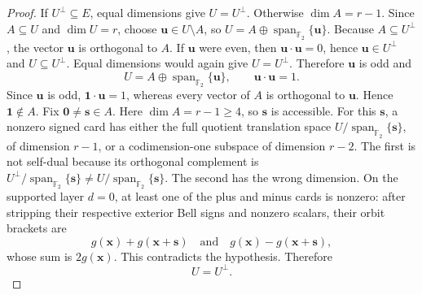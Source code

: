 \documentclass[11pt,letterpaper,onecolumn]{article}
\theoremstyle{plain}
\theoremstyle{definition}
\theoremstyle{remark}
\newcommand{\Ftwo}{\mathbb F_2}
\newcommand{\Span}{\operatorname{span}}
\newcommand{\one}{\mathbf 1}
\newcommand{\zero}{\mathbf 0}
\begin{document}
\begin{proof}
If \(U^\perp\subseteq E\), equal dimensions give \(U=U^\perp\).  Otherwise
\(\dim A=r-1\).  Since \(A\subseteq U\) and \(\dim U=r\), choose
\({\mathbf{u}}\in U\setminus A\), so
\(U=A\oplus\Span_{\Ftwo}\{{\mathbf{u}}\}\).  Because
\(A\subseteq U^\perp\), the vector \({\mathbf{u}}\) is orthogonal to \(A\).  If \({\mathbf{u}}\)
were even, then \({\mathbf{u}}\cdot {\mathbf{u}}=0\), hence \({\mathbf{u}}\in U^\perp\) and
\(U\subseteq U^\perp\). Equal dimensions would again give
\(U=U^\perp\).  Therefore \({\mathbf{u}}\) is odd and
\hypertarget{eq:v4-near-self-dual}{}
\begin{equation*}
 U=A\oplus\Span_{\Ftwo}\{{\mathbf{u}}\},
 \qquad {\mathbf{u}}\cdot {\mathbf{u}}=1.
\end{equation*}
Since \({\mathbf{u}}\) is odd, \(\one\cdot {\mathbf{u}}=1\), whereas every vector of \(A\) is
orthogonal to \({\mathbf{u}}\). Hence \(\one\notin A\).  Fix \(\zero\ne {\mathbf{s}}\in A\).
Here \(\dim A=r-1\ge4\), so \({\mathbf{s}}\) is accessible.  For this \({\mathbf{s}}\), a nonzero signed
card has either the full quotient translation space
\(U/\Span_{\Ftwo}\{{\mathbf{s}}\}\), of
dimension \(r-1\), or a codimension-one subspace of dimension \(r-2\).
The first is not self-dual because its orthogonal complement is
\(U^\perp/\Span_{\Ftwo}\{{\mathbf{s}}\}\ne
U/\Span_{\Ftwo}\{{\mathbf{s}}\}\). The second has the
wrong dimension.  On the supported layer \(d=0\), at least one of the plus
and minus cards is nonzero: after stripping their respective exterior Bell
signs and nonzero scalars, their orbit brackets are
\[
 g({\mathbf{x}})+g({\mathbf{x}}+{\mathbf{s}})
 \quad\text{and}\quad
 g({\mathbf{x}})-g({\mathbf{x}}+{\mathbf{s}}),
\]
whose sum is \(2g({\mathbf{x}})\).  This
contradicts the hypothesis.  Therefore
\[
 U=U^\perp.
\]


\end{proof}
\end{document}
